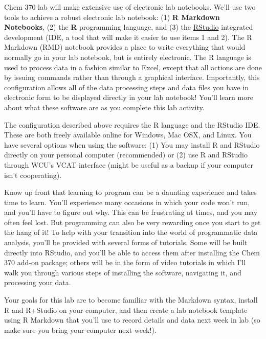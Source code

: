 \documentclass[]{tufte-book}
\begin{document}
Chem 370 lab will make extensive use of electronic lab notebooks. We'll use two tools to achieve a robust electronic lab notebook: (1) \textbf{R Markdown Notebooks}, (2) the \textbf{R} programming language, and (3) the \href{https://www.google.com/url?sa=t\&rct=j\&q=\&esrc=s\&source=web\&cd=\&cad=rja\&uact=8\&ved=2ahUKEwictpuN2IvqAhVtl3IEHUhSCUUQFjAAegQIAhAC\&url=https\%3A\%2F\%2Frstudio.com\%2F\&usg=AOvVaw2mM_qCjo878d2q5bcC0XUS}{RStudio} integrated development (IDE, a tool that will make it easier to use items 1 and 2). The R Markdown (RMD) notebook provides a place to write everything that would normally go in your lab notebook, but is entirely electronic. The R language is used to process data in a fashion similar to Excel, except that all actions are done by issuing commands rather than through a graphical interface. Importantly, this configuration allows all of the data processing steps and data files you have in electronic form to be displayed directly in your lab notebook! You'll learn more about what these software are as you complete this lab activity.

The configuration described above requires the R language and the RStudio IDE. These are both freely available online for Windows, Mac OSX, and Linux. You have several options when using the software: (1) You may install R and RStudio directly on your personal computer (recommended) or (2) use R and RStudio through WCU's VCAT interface (might be useful as a backup if your computer isn't cooperating).

Know up front that learning to program can be a daunting experience and takes time to learn. You'll experience many occasions in which your code won't run, and you'll have to figure out why. This can be frustrating at times, and you may often feel lost. But programming can also be very rewarding once you start to get the hang of it! To help with your transition into the world of programmatic data analysis, you'll be provided with several forms of tutorials. Some will be built directly into RStudio, and you'll be able to access them after installing the Chem 370 add-on package; others will be in the form of video tutorials in which I'll walk you through various steps of installing the software, navigating it, and processing your data.

Your goals for this lab are to become familiar with the Markdown syntax, install R and R+Studio on your computer, and then create a lab notebook template using R Markdown that you'll use to record details and data next week in lab (so make sure you bring your computer next week!).
\end{document}
